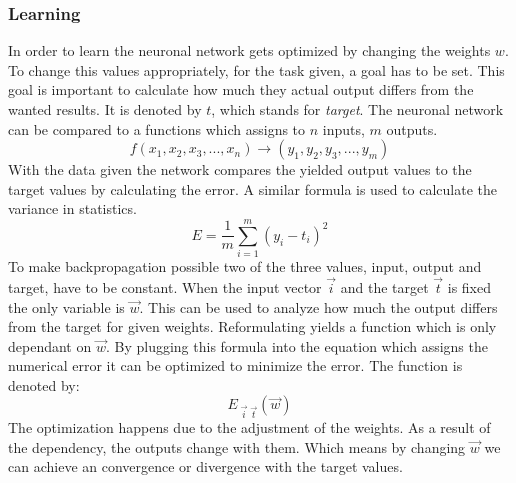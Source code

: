 \documentclass[12pt]{article}
\begin{document}
\subsubsection{Learning}
In order to learn the neuronal network gets optimized by changing the weights $w$. To change this values appropriately, for the task given, a goal has to be set. This goal is important to calculate how much they actual output differs from the wanted results. It is denoted by $t$, which stands for \textit{target}. The neuronal network can be compared to a functions which assigns to $n$ inputs, $m$ outputs.
\begin{equation}
    f(x_{1},x_{2},x_{3},...,x_{n}) \rightarrow (y_{1},y_{2},y_{3},...,y_{m})
\end{equation}
With the data given the network compares the yielded output values to the target values by calculating the error. A similar formula is used to calculate the variance in statistics.
\begin{equation}
   E = \frac{1}{m}\sum_{i=1}^{m}\left ( y_{i}- t_{i} \right )^{2}
\end{equation}
To make backpropagation possible two of the three values, input, output and target, have to be constant. When the input vector $\vec{i}$ and the target $\vec{t}$ is fixed the only variable is $\vec{w}$. This can be used to analyze how much the output differs from the target for given weights. Reformulating yields a function which is only dependant on $\vec{w}$. By plugging this formula into the equation which assigns the numerical error it can be optimized to minimize the error. The function is denoted by:
\begin{equation}
E_{\;\vec{i}\;\vec{t}}(\vec{w})
\end{equation}
The optimization happens due to the adjustment of the weights. As a result of the dependency, the outputs change with them. Which means by changing $\vec{w}$ we can achieve an convergence or divergence with the target values.
\end{document}
